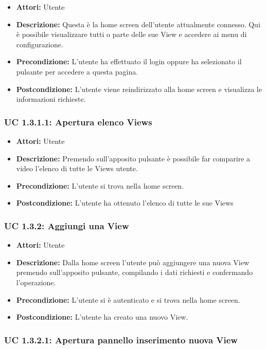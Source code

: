 \begin{itemize}
\item \textbf{Attori:} Utente
\item \textbf{Descrizione:} Questa è la home screen dell'utente attualmente connesso. Qui è possibile visualizzare tutti o parte delle sue View e accedere ai menu di configurazione.
\item \textbf{Precondizione:} L'utente ha effettuato il login oppure ha selezionato il pulsante per accedere a questa pagina.
\item \textbf{Postcondizione:} L'utente viene reindirizzato alla home screen e visualizza le informazioni richieste.
\end{itemize}

\subsubsection{UC 1.3.1.1: Apertura elenco Views}

\begin{itemize}
\item \textbf{Attori:} Utente
\item \textbf{Descrizione:} Premendo sull'apposito pulsante è possibile far comparire a video l'elenco di tutte le Views utente.
\item \textbf{Precondizione:} L'utente si trova nella home screen.
\item \textbf{Postcondizione:} L'utente ha ottenuto l'elenco di tutte le sue Views
\end{itemize}

\subsubsection{UC 1.3.2: Aggiungi una View}

\begin{itemize}
\item \textbf{Attori:} Utente
\item \textbf{Descrizione:} Dalla home screen l'utente può aggiungere una nuova View premendo sull'apposito pulsante, compilando i dati richiesti e confermando l'operazione.
\item \textbf{Precondizione:} L'utente si è autenticato e si trova nella home screen.
\item \textbf{Postcondizione:} L'utente ha creato una nuovo View.
\end{itemize}

\subsubsection{UC 1.3.2.1: Apertura pannello inserimento nuova View}

